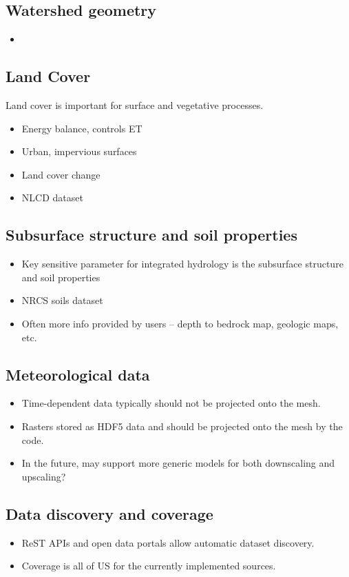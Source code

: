 \documentclass[a4paper,fleqn]{cas-dc}
\begin{document}
\subsection{Watershed geometry}\label{ssc:acquisition:geom}
%
\begin{itemize}
\item 
\end{itemize}

\subsection{Land Cover}\label{ssc:acquisition:land_cover}
%
Land cover is important for surface and vegetative processes.  
\begin{itemize}
\item Energy balance, controls ET
\item Urban, impervious surfaces
\item Land cover change
\item NLCD dataset
\end{itemize}
  
\subsection{Subsurface structure and soil properties}\label{ssc:acquisition:soil}
%
\begin{itemize}
\item Key sensitive parameter for integrated hydrology is the subsurface structure and soil properties
\item NRCS soils dataset
\item Often more info provided by users -- depth to bedrock map, geologic maps, etc.
\end{itemize}

\subsection{Meteorological data}\label{ssc:acquisition:met}
%
\begin{itemize}
\item Time-dependent data typically should not be projected onto the mesh.
\item Rasters stored as HDF5 data and should be projected onto the mesh by the code.
\item In the future, may support more generic models for both downscaling and upscaling?
\end{itemize}

\subsection{Data discovery and coverage}\label{ssc:acquisition:coverage}
%
\begin{itemize}
\item ReST APIs and open data portals allow automatic dataset discovery.
\item Coverage is all of US for the currently implemented sources.
\end{itemize}
\end{document}
